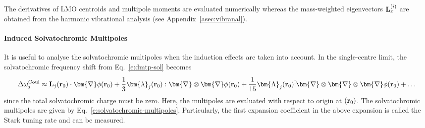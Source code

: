 \documentclass[a4paper,titlepage,twoside,fleqn,12pt]{book}
\newcommand{\BM}[1]{\bm{#1}}
\begin{document}
\begin{refsection}
The derivatives of LMO centroids and multipole moments are evaluated numerically whereas 
the mass\hyp{}weighted eigenvectors
${\bf L}_x^{(i)}$ 
are obtained from the harmonic vibrational analysis (see Appendix~\ref{asec:vibranal}).

\paragraph{Induced Solvatochromic Multipoles\label{p:solindmult}}
It is useful to analyse the solvatochromic multipoles 
when the induction effects are taken into account.
In the single\hyp{}centre limit, the solvatochromic
frequency shift from Eq.~\eqref{e:dmtp-sol}
becomes
%
\begin{equation} \label{e:dmtp-solmmm}
 \Delta\omega_j^{\rm Coul} \approx  
                        {\bf L}_j({\bf r}_0) \cdot {\BM \nabla} \phi({\bf r}_0)   + 
      \frac{1}{3} {\BM \lambda}_j({\bf r}_0) : {\BM \nabla} \otimes {\BM \nabla} \phi({\bf r}_0)   + 
     \frac{1}{15} {\BM \Lambda}_j({\bf r}_0) \vdots {\BM \nabla} \otimes {\BM \nabla} \otimes {\BM \nabla} \phi({\bf r}_0) + \ldots
\end{equation}
%
since the total solvatochromic charge must be zero. Here, the multipoles
are evaluated with respect to origin at $({\bf r}_0)$.
The solvatochromic multipoles are given by Eq.~\eqref{e:solvatochromic-multipoles}.
Particularly, the first expansion coefficient in the above expansion
is called the Stark tuning rate and can be measured.


\end{refsection}
\end{document}
